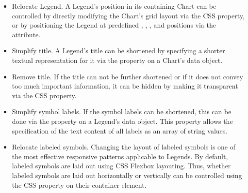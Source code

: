 \begin{itemize}

\item
Relocate Legend.
A Legend's position in its containing Chart can be controlled by directly modifying the Chart's grid layout via the CSS  property, or by positioning the Legend at predefined , , , and  positions via the  attribute.

\item
Simplify title.
A Legend's title can be shortened by specifying a shorter textual representation for it via the  property on a Chart's data object.

\item
Remove title.
If the title can not be further shortened or if it does not convey too much important information, it can be hidden by making it transparent via the CSS  property.

\item
Simplify symbol labels.
If the symbol labels can be shortened, this can be done via the  property on a Legend's data object.
This property allows the specification of the text content of all labels as an array of string values.

\item
Relocate labeled symbols.
Changing the layout of labeled symbols is one of the most effective responsive patterns applicable to Legends.
By default, labeled symbols are laid out using CSS Flexbox layouting.
Thus, whether labeled symbols are laid out horizontally or vertically can be controlled using the CSS  property on their container element.

\end{itemize}

\begin{samepage}
%
    WIP
  },
]{listings/legend-patterns.html}
\end{samepage}

